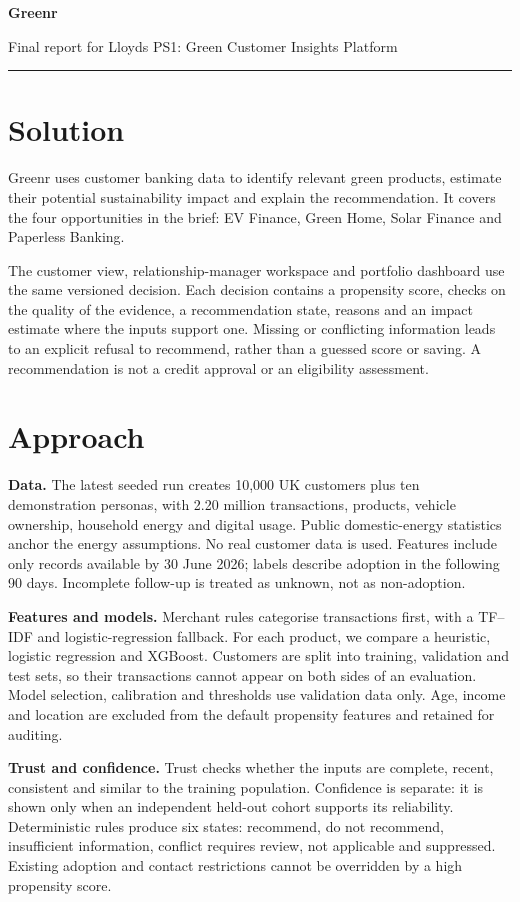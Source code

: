 \documentclass[10pt,a4paper]{article}
\begin{document}
{\LARGE\bfseries Greenr}\par
\vspace{2pt}
{\large Final report for Lloyds PS1: Green Customer Insights Platform}\par
\vspace{8pt}\hrule

\section{Solution}
Greenr uses customer banking data to identify relevant green products, estimate their potential sustainability impact and explain the recommendation. It covers the four opportunities in the brief: EV Finance, Green Home, Solar Finance and Paperless Banking.

The customer view, relationship-manager workspace and portfolio dashboard use the same versioned decision. Each decision contains a propensity score, checks on the quality of the evidence, a recommendation state, reasons and an impact estimate where the inputs support one. Missing or conflicting information leads to an explicit refusal to recommend, rather than a guessed score or saving. A recommendation is not a credit approval or an eligibility assessment.

\section{Approach}
\textbf{Data.} The latest seeded run creates 10,000 UK customers plus ten demonstration personas, with 2.20 million transactions, products, vehicle ownership, household energy and digital usage. Public domestic-energy statistics anchor the energy assumptions. No real customer data is used. Features include only records available by 30 June 2026; labels describe adoption in the following 90 days. Incomplete follow-up is treated as unknown, not as non-adoption.

\textbf{Features and models.} Merchant rules categorise transactions first, with a TF--IDF and logistic-regression fallback. For each product, we compare a heuristic, logistic regression and XGBoost. Customers are split into training, validation and test sets, so their transactions cannot appear on both sides of an evaluation. Model selection, calibration and thresholds use validation data only. Age, income and location are excluded from the default propensity features and retained for auditing.

\textbf{Trust and confidence.} Trust checks whether the inputs are complete, recent, consistent and similar to the training population. Confidence is separate: it is shown only when an independent held-out cohort supports its reliability. Deterministic rules produce six states: recommend, do not recommend, insufficient information, conflict requires review, not applicable and suppressed. Existing adoption and contact restrictions cannot be overridden by a high propensity score.
\end{document}
